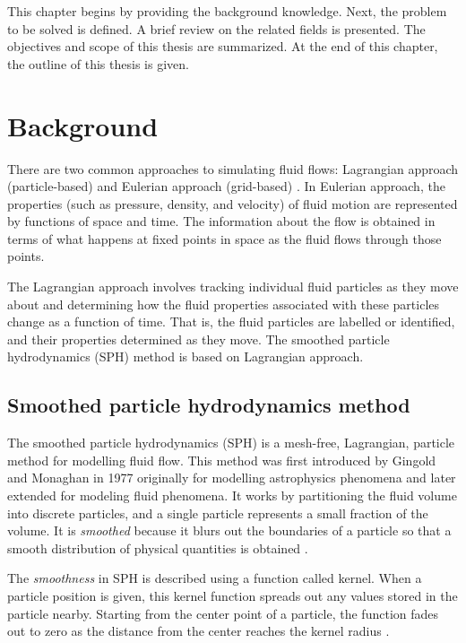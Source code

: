 \documentclass[a4paper, 12pt, oneside]{book}
\begin{document}
\begin{doublespace}
    This chapter begins by providing the background knowledge. Next, the problem to be solved is defined. A brief review on the related fields is presented. The objectives and scope of this thesis are summarized. At the end of this chapter, the outline of this thesis is given.
\end{doublespace}

\section{Background}

\begin{doublespace}
    There are two common approaches to simulating fluid flows: Lagrangian approach (particle-based) and Eulerian approach (grid-based) \cite[134]{cengel2014}. In Eulerian approach, the properties (such as pressure, density, and velocity) of fluid motion are represented by functions of space and time. The information about the flow is obtained in terms of what happens at fixed points in space as the fluid flows through those points.
    
    The Lagrangian approach involves tracking individual fluid particles as they move about and determining how the fluid properties associated with these particles change as a function of time. That is, the fluid particles are labelled or identified, and their properties determined as they move. The smoothed particle hydrodynamics (SPH) method is based on Lagrangian approach.
\end{doublespace}

\subsection{Smoothed particle hydrodynamics method}

\begin{doublespace}
    The smoothed particle hydrodynamics (SPH) is a mesh-free, Lagrangian, particle method for modelling fluid flow. This method was first introduced by Gingold and Monaghan in 1977 \cite{gingold1977} originally for modelling astrophysics phenomena and later extended for modeling fluid phenomena. It works by partitioning the fluid volume into discrete particles, and a single particle represents a small fraction of the volume. It is \textit{smoothed} because it blurs out the boundaries of a particle so that a smooth distribution of physical quantities is obtained \cite[116]{kim2017}.
    
    The \textit{smoothness} in SPH is described using a function called kernel. When a particle position is given, this kernel function spreads out any values stored in the particle nearby. Starting from the center point of a particle, the function fades out to zero as the distance from the center reaches the kernel radius \cite[117]{kim2017}.
\end{doublespace}
\end{document}
